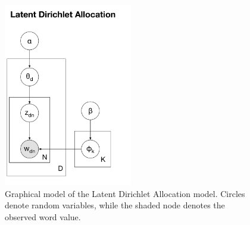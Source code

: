 \begin{figure}[tbh!]
\noindent \begin{centering}
\includegraphics[width=0.5\textwidth]{03-machine-learning/figures/lda.pdf}
\par\end{centering}
\caption[Graphical model of the Latent Dirichlet Allocation model.]{\label{fig:background-lda}Graphical model of the Latent Dirichlet Allocation model. Circles denote random variables, while the shaded node denotes the observed word value.}
\end{figure}

